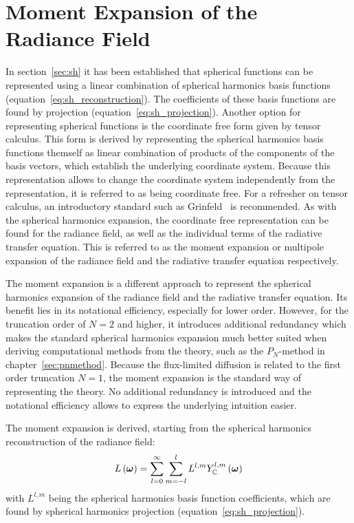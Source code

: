 \section{Moment Expansion of the Radiance Field}
\label{sec:da_moment_expansion_L}

In section~\ref{sec:sh} it has been established that spherical functions can be represented using a linear combination of spherical harmonics basis functions (equation~\ref{eq:sh_reconstruction}). The coefficients of these basis functions are found by projection (equation~\ref{eq:sh_projection}). Another option for representing spherical functions is the coordinate free form given by tensor calculus. This form is derived by representing the spherical harmonics basis functions themself as linear combination of products of the components of the basis vectors, which establish the underlying coordinate system. Because this representation allows to change the coordinate system independently from the representation, it is referred to as being coordinate free. For a refresher on tensor calculus, an introductory standard such as Grinfeld~\cite{Grinfeld13} is recommended. As with the spherical harmonics expansion, the coordinate free representation can be found for the radiance field, as well as the individual terms of the radiative transfer equation. This is referred to as the moment expansion or multipole expansion of the radiance field and the radiative transfer equation respectively.

The moment expansion is a different approach to represent the spherical harmonics expansion of the radiance field and the radiative transfer equation. Its benefit lies in its notational efficiency, especially for lower order. However, for the truncation order of $N=2$ and higher, it introduces additional redundancy which makes the standard spherical harmonics expansion much better suited when deriving computational methods from the theory, such as the $P_N$-method in chapter~\ref{sec:pnmethod}. Because the flux-limited diffusion is related to the first order truncation $N=1$, the moment expansion is the standard way of representing the theory. No additional redundancy is introduced and the notational efficiency allows to express the underlying intuition easier.

The moment expansion is derived, starting from the spherical harmonics reconstruction of the radiance field:
\begin{align}
\label{eq:fld_moment_expansion_sh_expansion}
L\left(\boldsymbol{\mathbf{\omega}}\right) =
\sum_{l=0}^{\infty}\sum_{m=-l}^{l}L^{l,m}Y_{\mathbb{C}}^{l,m}
\left(\boldsymbol{\mathbf{\omega}}\right)
\end{align}
with $L^{l,m}$ being the spherical harmonics basis function coefficients, which are found by spherical harmonics projection (equation~\ref{eq:sh_projection}).

